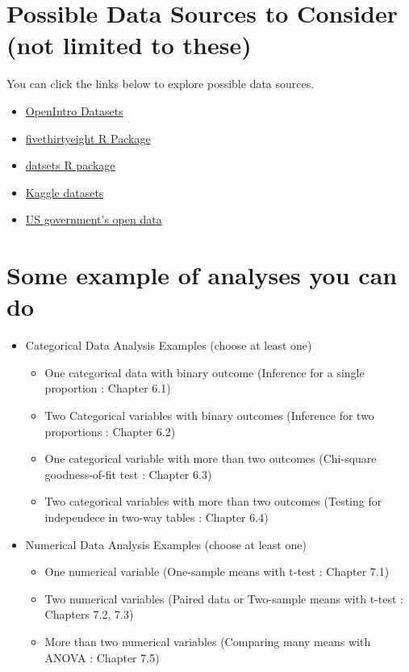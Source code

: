 \documentclass[12pt]{article}
\begin{document}
\section*{Possible Data Sources to Consider (not limited to these)}
You can click the links below to explore possible data sources.
\begin{itemize}
    \item \href{https://www.openintro.org/data/}{OpenIntro Datasets}
    \item \href{https://cran.r-project.org/web/packages/fivethirtyeight/vignettes/fivethirtyeight.html}{fivethirtyeight 
    R Package}
    \item \href{https://stat.ethz.ch/R-manual/R-devel/library/datasets/html/00Index.html}{datsets R package}
    \item \href{https://www.kaggle.com/datasets}{Kaggle datasets}
    \item \href{https://data.gov/}{US government's open data}
\end{itemize}


\section*{Some example of analyses you can do}
\begin{itemize}
     \item Categorical Data Analysis Examples (choose at least one)
    \begin{itemize}
        \item One categorical data with binary outcome (Inference for a single proportion : Chapter 6.1)
        \item Two Categorical variables with binary outcomes (Inference for two proportions : Chapter 6.2)
        \item One categorical variable with more than two outcomes (Chi-square goodness-of-fit test : Chapter 6.3)
        \item Two categorical variables with more than two outcomes (Testing for independece in two-way tables : Chapter 6.4)
    \end{itemize}

    \item Numerical Data Analysis Examples (choose at least one)
    \begin{itemize}
        \item One numerical variable (One-sample means with t-test : Chapter 7.1)
        \item Two numerical variables (Paired data or Two-sample means with t-test : Chapters 7.2, 7.3)
        \item More than two numerical variables (Comparing many means with ANOVA : Chapter 7.5)
    \end{itemize}
   
\end{itemize}
\end{document}

